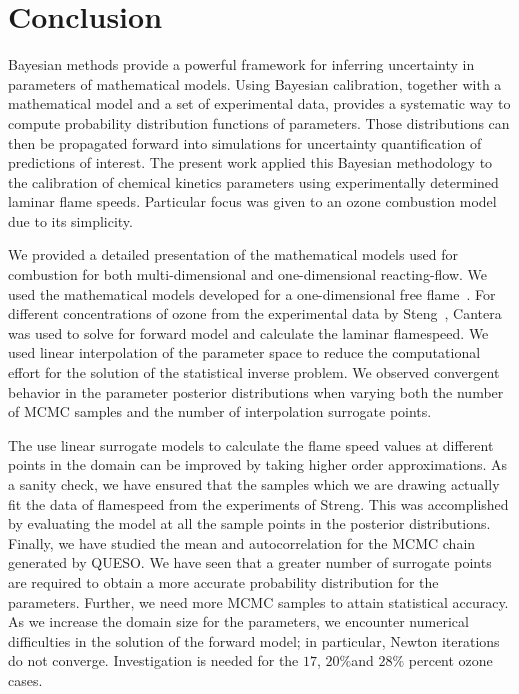 
\chapter{Conclusion}\label{chap:conclusion}

Bayesian methods provide a powerful framework for inferring
uncertainty in parameters of mathematical models. Using Bayesian
calibration, together with a mathematical model and
a set of experimental data, provides a systematic way to compute
probability distribution functions of parameters.
Those
distributions can then be propagated forward into simulations for
uncertainty quantification of predictions of interest. The present
work applied this Bayesian methodology to the calibration of chemical
kinetics parameters using experimentally determined
laminar flame speeds.
Particular focus was given to an ozone combustion model due to its simplicity.


We provided a detailed presentation of the mathematical models used for
combustion for both multi-dimensional and one-dimensional
reacting-flow. We used the mathematical models developed
for a one-dimensional free flame~\cite{Kuo}.
For different concentrations of ozone
from the experimental data by Steng~\cite{Streng},
Cantera~\cite{Cantera} was used to solve for forward model and
calculate the laminar flamespeed. We used linear interpolation of the
parameter space to reduce the computational effort for the solution of
the statistical inverse problem. We observed convergent behavior in
the parameter posterior distributions when varying both the number of
MCMC samples and the number of interpolation surrogate points.

The use linear surrogate models to calculate the flame
speed values at different points in the domain can be improved by
taking higher order approximations. As a sanity check, we have ensured
that the samples which we are drawing actually fit the data of
flamespeed from the experiments of Streng\cite{Streng}. This was
accomplished by evaluating the model at all the sample points in the
posterior distributions. Finally, we
have studied the mean and autocorrelation  for the
MCMC chain generated by QUESO.
We have seen that a greater number of surrogate points are
required to obtain a more accurate probability distribution for the
parameters. Further, we need more MCMC samples to attain statistical
accuracy. As we increase the domain size for the parameters, we
encounter numerical difficulties in the solution of the forward model;
in particular, Newton
iterations do not converge. Investigation is needed for the $17$,
$20 \% $and $ 28 \% $ percent ozone cases.

